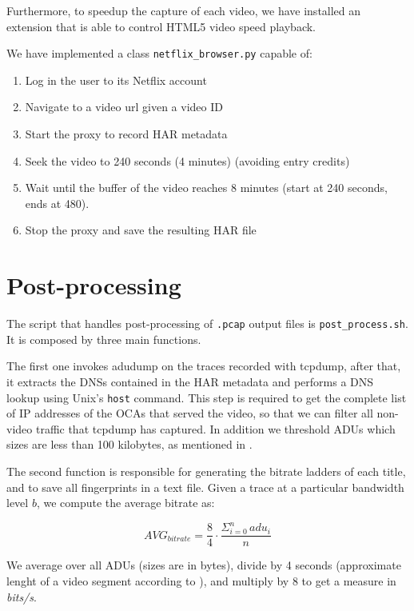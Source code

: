 Furthermore, to speedup the capture of each video, we have installed an
extension that is able to control HTML5 video speed playback.

\newpage
We have implemented a class \texttt{netflix\_browser.py} capable of:

\begin{enumerate}
    \item Log in the user to its Netflix account
    \item Navigate to a video url given a video ID
    \item Start the proxy to record HAR metadata
    \item Seek the video to 240 seconds (4 minutes) (avoiding entry credits)
    \item Wait until the buffer of the video reaches 8 minutes (start at 240
        seconds, ends at 480).
    \item Stop the proxy and save the resulting HAR file
\end{enumerate}


\section{Post-processing}

The script that handles post-processing of \texttt{.pcap} output files is
\texttt{post\_process.sh}. It is composed by three main functions.

The first one invokes adudump on the traces recorded with tcpdump, after that,
it extracts the DNSs contained in the HAR metadata and performs a DNS lookup
using Unix's \texttt{host} command. This step is required to get the complete
list of IP addresses of the OCAs that served the video, so that we can filter
all non-video traffic that tcpdump has captured. In addition we threshold ADUs
which sizes are less than 100 kilobytes, as mentioned in .

The second function is responsible for generating the bitrate ladders of each
title, and to save all fingerprints in a text file. Given a trace at a
particular bandwidth level $b$, we compute the average bitrate as:

\begin{equation*}\label{eq:avg_bitrate}
    AVG_{bitrate} = \dfrac{8}{4} \cdot \dfrac{\Sigma_{i=0}^{n} \hspace{2pt} adu_i}{n}
\end{equation*}

We average over all ADUs (sizes are in bytes), divide by 4 seconds (approximate
lenght of a video segment according to \cite{netflix-real-time}), and multiply
by 8 to get a measure in \emph{bits/s}. 

